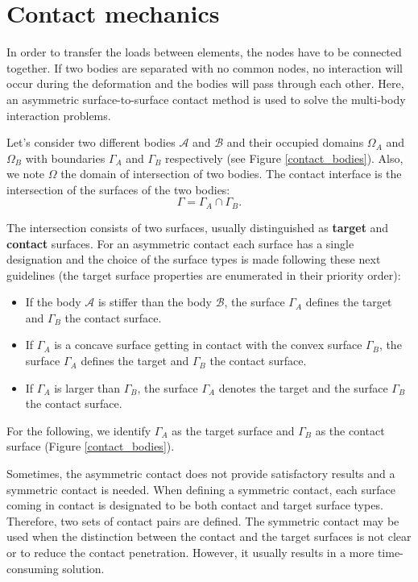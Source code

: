 \section{Contact mechanics}\label{section:contactmechanics}

In order to transfer the loads between elements, the nodes have to be connected together. If two bodies are separated with no common nodes, no interaction will occur during the deformation and the bodies will pass through each other. Here, an asymmetric surface-to-surface contact method is used to solve the multi-body interaction problems.

Let's consider two different bodies $\mathcal{A}$ and $\mathcal{B}$ and their occupied domains $\Omega_A$ and $\Omega_B$ with boundaries $\Gamma_A$ and $\Gamma_B$ respectively (see Figure \ref{contact_bodies}). Also, we note $\Omega$ the domain of intersection of two bodies. The contact interface is the intersection of the surfaces of the two bodies:
\begin{equation}
\Gamma = \Gamma_A \cap \Gamma_B.
\end{equation}

The intersection consists of two surfaces, usually distinguished as \textbf{target} and \textbf{contact} surfaces. For an asymmetric contact each surface has a single designation and the choice of the surface types is made following these next guidelines (the target surface properties are enumerated in their priority order):
\begin{itemize}
\item If the body $\mathcal{A}$ is stiffer than the body $\mathcal{B}$, the surface $\Gamma_A$ defines the target and $\Gamma_B$ the contact surface.
\item If $\Gamma_A$ is a concave surface getting in contact with the convex surface $\Gamma_B$, the surface $\Gamma_A$ defines the target and $\Gamma_B$ the contact surface.
\item If $\Gamma_A$ is larger than $\Gamma_B$, the surface $\Gamma_A$ denotes the target and the surface $\Gamma_B$ the contact surface.
\end{itemize} 
For the following, we identify $\Gamma_A$ as the target surface and $\Gamma_B$ as the contact surface (Figure \ref{contact_bodies}). 

 Sometimes, the asymmetric contact does not provide satisfactory results and a symmetric contact is needed. When defining a symmetric contact, each surface coming in contact is designated to be both contact and target surface types. Therefore, two sets of contact pairs are defined. The symmetric contact may be used when the distinction between the contact and the target surfaces is not clear or to reduce the contact penetration. However, it usually results in a more time-consuming solution.



